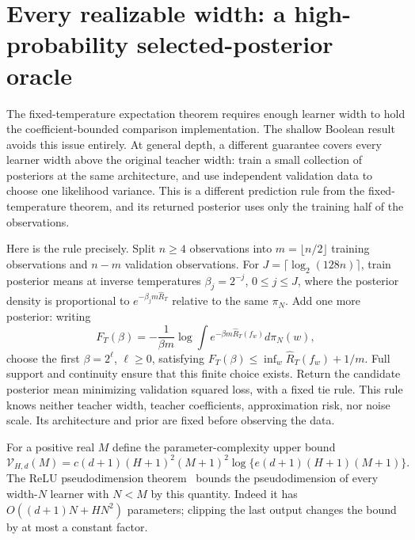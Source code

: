 \section{Every realizable width: a high-probability selected-posterior oracle}
\label{sec:all-width-results}
The fixed-temperature expectation theorem requires enough learner width to hold the coefficient-bounded comparison implementation. The shallow Boolean result avoids this issue entirely. At general depth, a different guarantee covers every learner width above the original teacher width: train a small collection of posteriors at the same architecture, and use independent validation data to choose one likelihood variance. This is a different prediction rule from the fixed-temperature theorem, and its returned posterior uses only the training half of the observations.

Here is the rule precisely. Split $n\ge4$ observations into $m=\lfloor n/2\rfloor$ training observations and $n-m$ validation observations. For $J=\lceil\log_2(128n)\rceil$, train posterior means at inverse temperatures $\beta_j=2^{-j}$, $0\le j\le J$, where the posterior density is proportional to $e^{-\beta_j m\widehat R_T}$ relative to the same $\pi_N$. Add one more posterior: writing
\[
 F_T(\beta)=-\frac1{\beta m}\log\int e^{-\beta m\widehat R_T(f_w)}d\pi_N(w),
\]
choose the first $\beta=2^\ell$, $\ell\ge0$, satisfying
$F_T(\beta)\le\inf_w\widehat R_T(f_w)+1/m$.
Full support and continuity ensure that this finite choice exists. Return the candidate posterior mean minimizing validation squared loss, with a fixed tie rule. This rule knows neither teacher width, teacher coefficients, approximation risk, nor noise scale. Its architecture and prior are fixed before observing the data.

For a positive real $M$ define the parameter-complexity upper bound
\[
 \mathcal V_{H,d}(M)=c(d+1)(H+1)^2(M+1)^2
       \log\{e(d+1)(H+1)(M+1)\}.
\]
The ReLU pseudodimension theorem~\cite{pdim} bounds the pseudodimension of every width-$N$ learner with $N<M$ by this quantity. Indeed it has $O((d+1)N+HN^2)$ parameters; clipping the last output changes the bound by at most a constant factor.

